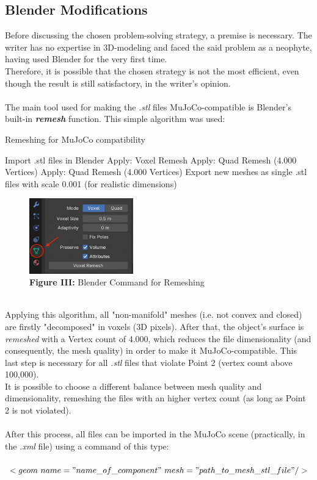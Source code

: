 \documentclass[a4paper, 12pt]{article}
\def\FigureThree{\centering\includegraphics[width=0.4\textwidth]{Figures/fig03.pdf}}
\begin{document}
 \subsection{Blender Modifications}
 Before discussing the chosen problem-solving strategy, a premise is necessary. The writer has no expertise in 3D-modeling and faced the said problem as a neophyte, having used Blender for the very first time. 
 \\Therefore, it is possible that the chosen strategy is not the most efficient, even though the result is still satisfactory, in the writer's opinion.
 \\\\The main tool used for making the \textit{.stl} files MuJoCo-compatible is Blender's built-in \textbf{\textit{remesh}} function.  This simple algorithm was used:\\
\begin{algorithm}[h!]
\caption{Remeshing for MuJoCo compatibility}
\begin{algorithmic}
    \STATE Import .stl files in Blender
            \STATE Apply: Voxel Remesh
            \STATE Apply: Quad Remesh (4.000 Vertices)
            \STATE Apply: Quad Remesh (4.000 Vertices)
        \ENDIF
    \ENDFOR
\STATE Export new meshes as single .stl files with scale 0.001 (for realistic dimensions)
\end{algorithmic}
\end{algorithm}
\begin{figure}[h!]
    \FigureThree
    \caption*{\textbf{Figure III:} Blender Command for Remeshing}
    \label{fig:fig03}
\end{figure} 
\\Applying this algorithm, all "non-manifold" meshes (i.e. not convex and closed) are firstly "decomposed" in voxels (3D pixels). After that, the object's surface is \textit{remeshed} with a Vertex count of 4.000, which reduces the file dimensionality (and consequently, the mesh quality) in order to make it MuJoCo-compatible. This last step is necessary for all \textit{.stl} files that violate Point 2 (vertex count above 100,000).
\\It is possible to choose a different balance between mesh quality and dimensionality, remeshing the files with an higher vertex count (as long as Point 2 is not violated).
\\\\After this process, all files can be imported in the MuJoCo scene (practically, in the \textit{.xml} file) using a command of this type:\\\\
$<geom\ name="name\_of\_component"\ mesh="path\_to\_mesh\_stl\_file"/>$
\end{document}
